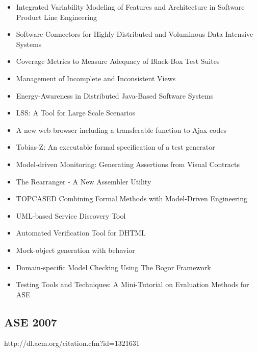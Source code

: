 {\begin{itemize}[itemsep=-1ex]
  \item Integrated Variability Modeling of Features and Architecture in Software Product Line Engineering
  \item Software Connectors for Highly Distributed and Voluminous Data Intensive Systems
  \item Coverage Metrics to Measure Adequacy of Black-Box Test Suites
  \item Management of Incomplete and Inconsistent Views
  \item Energy-Awareness in Distributed Java-Based Software Systems
  \item LSS: A Tool for Large Scale Scenarios
  \item A new web browser including a transferable function to Ajax codes
  \item Tobias-Z: An executable formal specification of a test generator
  \item Model-driven Monitoring: Generating Assertions from Visual Contracts
  \item The Rearranger - A New Assembler Utility
  \item TOPCASED Combining Formal Methods with Model-Driven Engineering
  \item UML-based Service Discovery Tool
  \item Automated Verification Tool for DHTML
  \item Mock-object generation with behavior
  \item Domain-specific Model Checking Using The Bogor Framework
  \item Testing Tools and Techniques: A Mini-Tutorial on Evaluation Methods for ASE
\end{itemize}
}

\subsection{ASE 2007}

http://dl.acm.org/citation.cfm?id=1321631

